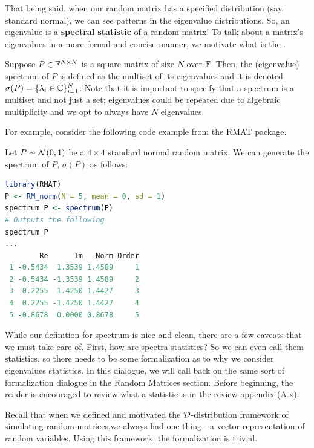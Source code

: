 That being said, when our random matrix has a specified distribution (say, standard normal), we can see patterns in the eigenvalue distributions. So, an eigenvalue is a \textbf{spectral statistic} of a random matrix! To talk about a matrix's eigenvalues in a more formal and concise manner, we motivate what is the .

\newpage

\begin{definition}[Spectrum]
Suppose $P \in \mathbb{F}^{N \times N}$ is a square matrix of size $N$ over $\mathbb{F}$. Then, the (eigenvalue) spectrum of $P$ is defined as the multiset of its eigenvalues and it is denoted $\sigma(P) = \{\lambda_i  \in \mathbb{C}\}_{i=1}^N$. Note that it is important to specify that a spectrum is a multiset and not just a set; eigenvalues could be repeated due to algebraic multiplicity and we opt to always have $N$ eigenvalues. 
\end{definition}

For example, consider the following code example from the RMAT package.
\begin{code}
Let $P \sim \mathcal{N}(0,1)$ be a $4 \times 4$ standard normal random matrix. We can generate the spectrum of $P$, $\sigma(P)$ as follows:
\end{code}

\begin{lstlisting}[language=R]
library(RMAT)
P <- RM_norm(N = 5, mean = 0, sd = 1)
spectrum_P <- spectrum(P)
# Outputs the following
spectrum_P
...
        Re      Im   Norm Order
 1 -0.5434  1.3539 1.4589     1
 2 -0.5434 -1.3539 1.4589     2
 3  0.2255  1.4250 1.4427     3
 4  0.2255 -1.4250 1.4427     4
 5 -0.8678  0.0000 0.8678     5
\end{lstlisting}



While our definition for spectrum is nice and clean, there are a few caveats that we must take care of. First, how are spectra statistics? So we can even call them statistics, so there needs to be some formalization as to why we consider eigenvalues statistics. In this dialogue, we will call back on the same sort of formalization dialogue in the Random Matrices section. Before beginning, the reader is encouraged to review what a statistic is in the review appendix (A.x).

Recall that when we defined and motivated the $\mathcal{D}$-distribution framework of simulating random matrices,we always had one thing - a vector representation of random variables. Using this framework, the formalization is trivial.

